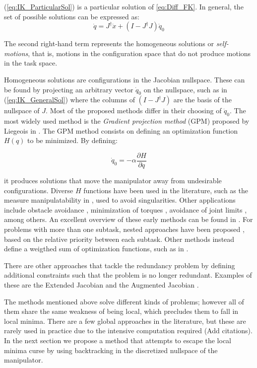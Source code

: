 \documentclass[conference]{IEEEtran}
\newcommand{\J}{\ensuremath{J}}
\newcommand{\Jps}{\ensuremath{J^{\dagger}}}
\newcommand{\dx}{\ensuremath{\dot{x}}}
\newcommand{\dq}{\ensuremath{\dot{q}}}
\newcommand{\q}{\ensuremath{q}}
\begin{document}
(\ref{eq:IK_ParticularSol}) is a particular solution of \ref{eq:Diff_FK}. In general, the set of possible solutions can be expressed as:
\begin{equation}
\dq = \Jps \dx + (I - \Jps \J)\dq_{0}
\label{eq:IK_GeneralSol}
\end{equation}

The second right-hand term represents the homogeneous solutions or \textit{self-motions}, that is, motions 
in the configuration space that do not produce motions in the task space. 

Homogeneous solutions are configurations in the Jacobian nullspace. These can be found by projecting 
an arbitrary vector $\dq_{0}$ on the nullspace, such as in (\ref{eq:IK_GeneralSol}) where the columns 
of $(I - \Jps \J)$ are the basis of the nullspace of $\J$. Most of the proposed methods differ in 
their choosing of $\dq_{0}$. The most widely used method is the \textit{Gradient projection method} 
(GPM) proposed by Liegeois in \cite{liegeois-ns-1977}. The GPM method consists on defining an 
optimization function $H(\q)$ to be minimized. By defining:

\begin{equation}
\dq_{0} = -\alpha \dfrac{\partial H}{\partial \q}
\end{equation}

it produces solutions that move the manipulator away from undesirable configurations. 
Diverse $H$ functions have been used in the literature, such as the measure manipulatability
 in \cite{yoshikawa-ns-1985}, used to avoid singularities. Other applications include obstacle
avoidance \cite{klein-ns-1985}, minimization of torques \cite{hollerbach-ns-1985}, avoidance
of joint limits \cite{liegeois-ns-1977}, among others. An excellent overview of these early
methods can be found in \cite{siciliano-ns-1990}. For problems with more than one subtask,
nested approaches have been proposed \cite{chiaverini-ns-1997}\cite{nakamura-ns-1987}, 
based on the relative priority between each subtask. Other methods instead define a weigthed
sum of optimization functions, such as in \cite{buss-ns-2006}. 

There are other approaches that tackle the redundancy problem by defining additional constraints
 such that the problem is no longer redundant. Examples of these are the Extended Jacobian 
\cite{baillieul-ns-1985} and the Augmented Jacobian \cite{sciavicco-ns-1988}\cite{egeland-ns-1987}.
\medskip 

The methods mentioned above solve different kinds of problems; however all of them share the same 
weakness of being local, which precludes them to fall in local minima. There are a few global 
approaches in the literature, but these are rarely used in practice due to the intensive computation required
(Add citations). In the next section we propose a method that attempts to escape the local minima curse by 
using backtracking in the discretized nullspace of the manipulator.
\end{document}
